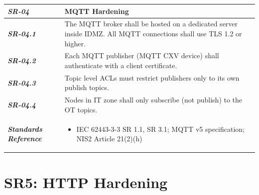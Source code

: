 \documentclass{report}
\begin{document}
\begin{tabularx}{\textwidth}{>{\bfseries}p{2.5cm} X}
    \textit{SR-04} & \textbf{MQTT Hardening} \vspace{0.5em}\\
\toprule
\textit{SR-04.1} &
    The MQTT broker shall be hosted on a dedicated server inside IDMZ. All MQTT connections shall use TLS 1.2 or higher.
    \vspace{0.5em}
\\
\textit{SR-04.2} &
    Each MQTT publisher (MQTT CXV device) shall authenticate with a client certificate.
    \vspace{0.5em}
    \\
\textit{SR-04.3} &
    Topic level ACLs must restrict publishers only to its own publish topics.
    \vspace{0.5em}
    \\
\textit{SR-04.4} &
    Nodes in IT zone shall only subscribe (not publish) to the OT topics.
    \vspace{0.5em}
    \\
\midrule
    \textit{Standards Reference} &
\begin{itemize}[label=-, noitemsep, topsep=0pt, leftmargin=*]
    \item IEC 62443-3-3 SR 1.1, SR 3.1; MQTT v5 specification; NIS2 Article 21(2)(h)
\end{itemize} \vspace{1em} \\ 
\end{tabularx}
\vspace{2em}

\section{SR5: HTTP Hardening}\label{SR5:http}
\end{document}
